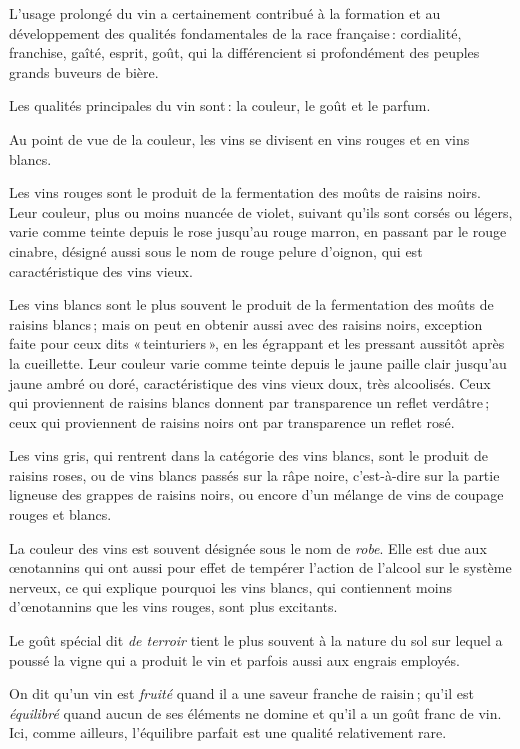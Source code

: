 L'usage prolongé du vin a certainement contribué à la formation et au
développement des qualités fondamentales de la race française : cordialité,
franchise, gaîté, esprit, goût, qui la différencient si profondément des
peuples grands buveurs de bière.

\medskip

Les qualités principales du vin sont : la couleur, le goût et le parfum.

Au point de vue de la couleur, les vins se divisent en vins rouges et en vins
blancs.

Les vins rouges sont le produit de la fermentation des moûts de raisins noirs.
Leur couleur, plus ou moins nuancée de violet, suivant qu'ils sont corsés ou
légers, varie comme teinte depuis le rose jusqu'au rouge marron, en passant par
le rouge cinabre, désigné aussi sous le nom de rouge pelure d'oignon, qui est
caractéristique des vins vieux.

Les vins blancs sont le plus souvent le produit de la fermentation des moûts de
raisins blancs ; mais on peut en obtenir aussi avec des raisins noirs,
exception faite pour ceux dits « teinturiers », en les égrappant et les
pressant aussitôt après la cueillette. Leur couleur varie comme teinte depuis
le jaune paille clair jusqu'au jaune ambré ou doré, caractéristique des vins
vieux doux, très alcoolisés. Ceux qui proviennent de raisins blancs donnent par
transparence un reflet verdâtre ; ceux qui proviennent de raisins noirs ont par
transparence un reflet rosé.

Les vins gris, qui rentrent dans la catégorie des vins blancs, sont le produit
de raisins roses, ou de vins blancs passés sur la râpe noire, c'est-à-dire sur
la partie ligneuse des grappes de raisins noirs, ou encore d'un mélange de vins
de coupage rouges et blancs.

La couleur des vins est souvent désignée sous le nom de \textit{robe}. Elle est
due aux œnotannins qui ont aussi pour effet de tempérer l'action de l'alcool
sur le système nerveux, ce qui explique pourquoi les vins blancs, qui
contiennent moins d'œnotannins que les vins rouges, sont plus excitants.

Le goût spécial dit \textit{de terroir} tient le plus souvent à la nature du
sol sur lequel a poussé la vigne qui a produit le vin et parfois aussi aux
engrais employés.

On dit qu'un vin est \textit{fruité} quand il a une saveur franche de raisin ;
qu'il est \textit{équilibré} quand aucun de ses éléments ne domine et qu'il
a un goût franc de vin. Ici, comme ailleurs, l'équilibre parfait est une
qualité relativement rare.

